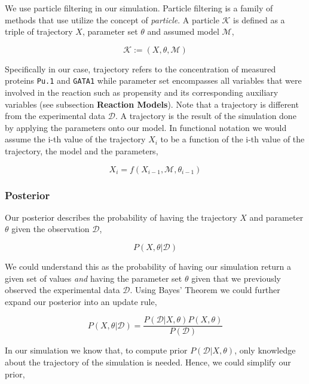 \documentclass{bioinfo}
\begin{document}
We use particle filtering in our simulation. Particle filtering is a family of methods that use utilize the concept of \textit{particle}. A particle $\mathcal{K}$ is defined as a triple of trajectory $X$, parameter set $\theta$ and assumed model $\mathcal{M}$,

\begin{equation}
\mathcal{K} := (X, \theta, \mathcal{M})\label{eq:01}
\end{equation}

Specifically in our case, trajectory refers to the concentration of measured proteins \texttt{Pu.1} and \texttt{GATA1} while parameter set encompasses all variables that were involved in the reaction such as propensity and its corresponding auxiliary variables (see subsection \textbf{Reaction Models}). Note that a trajectory is different from the experimental data $\mathcal{D}$. A trajectory is the result of the simulation done by applying the parameters onto our model. In functional notation we would assume the i-th value of the trajectory $X_i$ to be a function of the i-th value of the trajectory, the model and the parameters,

\begin{equation}
X_i = f(X_{i - 1}, \mathcal{M}, \theta_{i - 1})\label{eq:02}
\end{equation}

\subsubsection{Posterior}

Our posterior describes the probability of having the trajectory $X$ and parameter $\theta$ given the observation $\mathcal{D}$,

\begin{equation}
P(X, \theta | \mathcal{D})\label{eq:03}
\end{equation}

We could understand this as the probability of having our simulation return a given set of values \textit{and} having the parameter set $\theta$ given that we previously observed the experimental data $\mathcal{D}$. Using Bayes' Theorem we could further expand our posterior into an update rule,

\begin{equation}
P(X, \theta | \mathcal{D}) = \frac{P(\mathcal{D} | X, \theta)  P(X, \theta)}{P(\mathcal{D})}\label{eq:04}
\end{equation}

In our simulation we know that, to compute prior $P(\mathcal{D} | X, \theta)$, only knowledge about the trajectory of the simulation is needed. Hence, we could simplify our prior,
\end{document}
